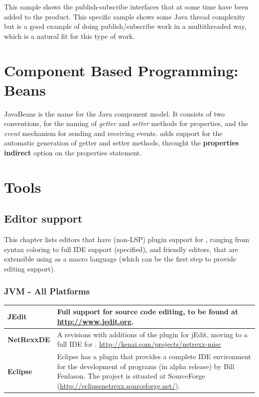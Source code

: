 {
This sample shows the publish-subscribe interfaces that at some time have been
added to the product. This specific sample shows some Java thread
complexity but is a good example of doing publish/subscribe work in a
multithreaded way, which is a natural fit for this type of work.



\chapter{Component Based Programming: Beans}
JavaBeans is the name for the Java component model. It consists of two
conventions, for the naming of \emph{getter} and \emph{setter} methods
for properties, and the \emph{event} mechanism for sending and
receiving events. \nr{} adds support for the automatic generation of
getter and setter methods, throught the \textbf{properties indirect}
option on the properties statement.



\chapter{\nr{} Tools}



\section{Editor support}\label{editors}
This chapter lists editors that have (non-LSP) plugin support for \nr{},
ranging from syntax coloring to full IDE support (specified), and
\Rexx{} friendly editors, that are extensible using \Rexx{} as a macro
language (which can be the first step to provide \nr{} editing support).


\subsection{JVM - All Platforms}
\begin{tabularx}{\textwidth}{>{\bfseries}lX}
\toprule
JEdit & Full support for \nr{} source code editing, to be found at
\url{http://www.jedit.org}.
\\\midrule
NetRexxDE & A revisions with additions of the \nr{} plugin for
jEdit, moving to a full IDE for \nr{}. \url{http://kenai.com/projects/netrexx-misc} 
\\\midrule
Eclipse & Eclipse has a \nr{} plugin that provides a complete IDE
environment for the development of \nr{} programs (in alpha release)
by Bill Fenlason. The project is situated at SourceForge
(\url{http://eclipsenetrexx.sourceforge.net/}).
\\\bottomrule
\end{tabularx}
}
